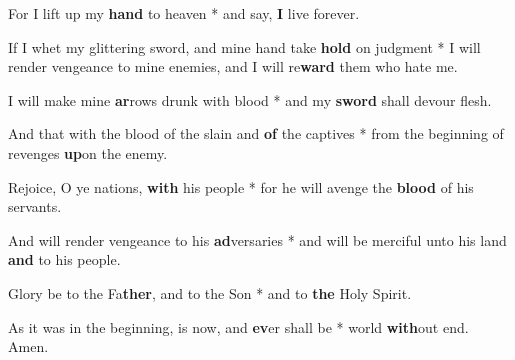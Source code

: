 \begin{multicols}{2}
	For I lift up my \textbf{hand} to heaven * and say, \textbf{I} live forever.
	
	If I whet my glittering sword, and mine hand take \textbf{hold} on judgment * I will render vengeance to mine enemies, and I will re\textbf{ward} them who hate me.
	
	I will make mine \textbf{ar}rows drunk with blood * and my \textbf{sword} shall devour flesh.
	
	And that with the blood of the slain and \textbf{of} the captives * from the beginning of revenges \textbf{up}on the enemy.
	
	Rejoice, O ye nations, \textbf{with} his people * for he will avenge the \textbf{blood} of his servants.
	
	And will render vengeance to his \textbf{ad}versaries * and will be merciful unto his land \textbf{and} to his people.
	
	Glory be to the Fa\textbf{ther}, and to the Son * and to \textbf{the} Holy Spirit.
	
	As it was in the beginning, is now, and \textbf{ev}er shall be * world \textbf{with}out end. Amen.
\end{multicols}